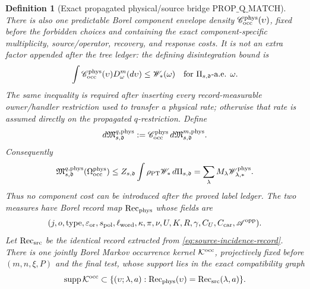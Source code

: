 \documentclass[11pt]{article}
\newtheorem{definition}[theorem]{Definition}
\begin{document}
\begin{definition}[Exact propagated physical/source bridge
$\mathrm{PROP\_Q\_MATCH}$]
There is also one predictable Borel component envelope density
$\mathscr C_{\rm occ}^{\rm phys}(\upsilon)$, fixed before the forbidden
choices and containing the exact component-specific multiplicity,
source/operator, recovery, and response costs.  It is not an extra factor
appended after the tree ledger: the defining disintegration bound is
\begin{equation}
\label{eq:physical-occurrence-envelope-disintegration}
 \int\mathscr C_{\rm occ}^{\rm phys}(\upsilon)
       D_\omega^m(d\upsilon)\le\mathscr W_*(\omega)
 \quad\text{for }\Pi_{s,\mathfrak d}\text{-a.e. }\omega.
\end{equation}
The same inequality is required after inserting every record-measurable
owner/handler restriction used to transfer a physical rate; otherwise that
rate is assumed directly on the propagated $q$-restriction.  Define
\begin{equation}
\label{eq:physical-occurrence-q-measure}
 d\mathfrak M_{s,\mathfrak d}^{q,\rm phys}
 :=\mathscr C_{\rm occ}^{\rm phys}\,
   d\mathfrak M_{s,\mathfrak d}^{m,\rm phys}.
\end{equation}
Consequently
\begin{equation}
\label{eq:physical-occurrence-total-ledger}
 \mathfrak M_{s,\mathfrak d}^{q,\rm phys}
       (\Omega_{\rm occ}^{\rm phys})
 \le Z_{s,\mathfrak d}\int\rho_{\rm PT}\mathscr W_*\,d\Pi_{s,\mathfrak d}
 =\sum_\lambda M_\lambda\mathscr W_{\lambda,*}^{\rm phys}.
\end{equation}
Thus no component cost can be introduced after the proved label ledger.  The two measures have
Borel record map
$\operatorname{Rec}_{\rm phys}$ whose fields are
\begin{equation}
\label{eq:physical-occurrence-record}
 (j,o,\operatorname{type},\varepsilon_{\rm or},s_{\rm pol},
   \ell_{\rm word},\kappa,\pi,\nu,U,K,R,\gamma,C_U,C_{\rm car},
   \mathscr A^{\rm opp}).
\end{equation}
Let $\operatorname{Rec}_{\rm src}$ be the identical record extracted from
\eqref{eq:source-incidence-record}.  There is one jointly Borel Markov
occurrence kernel $\mathcal K^{\rm occ}$, projectively fixed before
$(m,n,\xi,P)$ and the final test, whose support lies in the exact
compatibility graph
\begin{equation}
\label{eq:prop-q-compatibility-graph}
 \operatorname{supp}\mathcal K^{\rm occ}
 \subset\{(\upsilon;\lambda,a):
  \operatorname{Rec}_{\rm phys}(\upsilon)
   =\operatorname{Rec}_{\rm src}(\lambda,a)\}.
\end{equation}

\end{definition}
\end{document}
